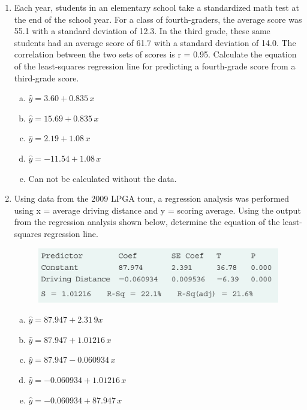 \documentclass[a4paper,12pt,twoside]{book}
\begin{document}
\begin{enumerate}
 \item  Each year, students in an elementary school take a standardized math test at the end of the school year. For a class of fourth-graders, the average score was 55.1 with a standard deviation of 12.3. In the third grade, these same students had an average score of 61.7 with a standard deviation of 14.0. The correlation between the two sets of scores is r = 0.95. Calculate the equation of the least-squares regression line for predicting a fourth-grade score from a third-grade score.
 
     \begin{enumerate}[(a)]
         \item $\hat{y} = 3.60 + 0.835 \,x$
         \item $\hat{y} = 15.69 + 0.835 \,x$
         \item $\hat{y} = 2.19 + 1.08 \,x$
         \item $\hat{y} = -11.54 + 1.08\, x$
         \item Can not be calculated without the data.
     \end{enumerate}
     \vspace{0.3cm}
     
     \item Using data from the 2009 LPGA tour, a regression analysis was performed using x = average driving distance and y = scoring average. Using the output from the regression analysis shown below, determine the equation of the least-squares regression line.
         \begin{figure}[H]
             \centering
             \includegraphics[scale=0.5]{figure0205}
         \end{figure}
         \begin{enumerate}[(a)]
             \item $\hat{y} = 87.947 + 2.31\,9x$
             \item $\hat{y} = 87.947 + 1.01216\,x$
             \item $\hat{y} = 87.947 - 0.060934\,x$
             \item $\hat{y} = -0.060934 + 1.01216\,x$
             \item $\hat{y} = -0.060934 + 87.947\,x$
         \end{enumerate}
         \vspace{0.3cm}
    

\end{enumerate}
\end{document}
